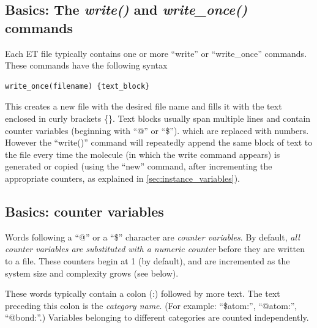 \documentclass[11pt]{article}
\begin{document}
\subsection{Basics: The \textit{write()} and \textit{write\_once()} commands}
\label{sec:write}
Each ET file typically contains one or more 
``write'' or ``write\_once'' commands. 
These commands have the following syntax 
\begin{verbatim}
write_once(filename) {text_block}
\end{verbatim}
This creates a new file with the desired file name 
and fills it with the text enclosed in curly brackets \{\}.
Text blocks usually span multiple lines and contain counter variables 
(beginning with ``@'' or ``\$'').
which are replaced with numbers.
However the ``write()'' command will repeatedly append the 
same block of text to the file every time the molecule 
(in which the write command appears) is generated or copied 
(using the ``new'' command, 
after incrementing the appropriate counters,
as explained in \ref{sec:instance_variables}).


\subsection{Basics: counter variables}
\label{sec:variables}

Words following a ``@'' or a ``\$'' character
are \textit{counter variables}. 
By default, 
\textit{all counter variables are substituted with a numeric counter}
before they are written to a file. 
These counters begin at 1 (by default), and 
are incremented as the system size and complexity grows (see below).

These words typically contain a colon (:) followed by more text.
The text preceding this colon is the \textit{category name}. 
(For example: ``\$atom:'', ``@atom:'', ``@bond:''.)
Variables belonging to different categories 
are counted independently. 
\end{document}

